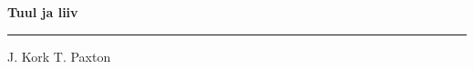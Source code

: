\documentclass[10pt]{book}
\begin{document}
{
  \samepage
  \raggedbottom
  \raggedright
  \sloppy


  \vspace{0.2in}

  \noindent\begin{minipage}{.1\textwidth}
    \hfill\vspace{0.1in}
  \end{minipage}%
  \noindent\begin{minipage}{.8\textwidth}
    \centering
    \bfseries
    \large Tuul ja liiv
  \end{minipage}%
  \noindent\begin{minipage}{.1\textwidth}
      \hfill\vspace{0.1in}
  \end{minipage}

  \nopagebreak[4]
  \vspace{0.1in}
  \nopagebreak[4]
  \hrule height 0.05ex
  \nopagebreak[4]
  \vspace{-0.05in}

  {\footnotesize J. Kork \hfill T. Paxton }\\
  \vspace{0.01in}



}
\end{document}
